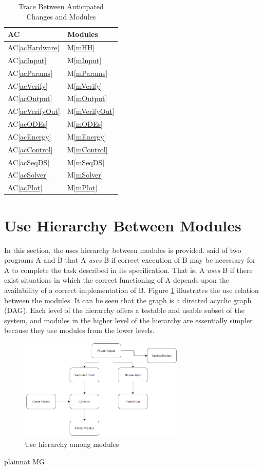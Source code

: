 \documentclass[12pt, titlepage]{article}
\newcommand{\acref}[1]{AC\ref{#1}}
\newcommand{\mref}[1]{M\ref{#1}}
\begin{document}
\begin{table}[H]
\centering
\begin{tabular}{p{} p{}}
\toprule
\textbf{AC} & \textbf{Modules}\\
\midrule
\acref{acHardware} & \mref{mHH}\\
\acref{acInput} & \mref{mInput}\\
\acref{acParams} & \mref{mParams}\\
\acref{acVerify} & \mref{mVerify}\\
\acref{acOutput} & \mref{mOutput}\\
\acref{acVerifyOut} & \mref{mVerifyOut}\\
\acref{acODEs} & \mref{mODEs}\\
\acref{acEnergy} & \mref{mEnergy}\\
\acref{acControl} & \mref{mControl}\\
\acref{acSeqDS} & \mref{mSeqDS}\\
\acref{acSolver} & \mref{mSolver}\\
\acref{acPlot} & \mref{mPlot}\\
\bottomrule
\end{tabular}
\caption{Trace Between Anticipated Changes and Modules}
\label{TblACT}
\end{table}

\section{Use Hierarchy Between Modules} \label{SecUse}

In this section, the uses hierarchy between modules is
provided. \citet{Parnas1978} said of two programs A and B that A {\em uses} B if
correct execution of B may be necessary for A to complete the task described in
its specification. That is, A {\em uses} B if there exist situations in which
the correct functioning of A depends upon the availability of a correct
implementation of B.  Figure \ref{FigUH} illustrates the use relation between
the modules. It can be seen that the graph is a directed acyclic graph
(DAG). Each level of the hierarchy offers a testable and usable subset of the
system, and modules in the higher level of the hierarchy are essentially simpler
because they use modules from the lower levels.

\begin{figure}[H]
\centering
\includegraphics[width=0.7\textwidth]{UsesHierarchy.png}
\caption{Use hierarchy among modules}
\label{FigUH}
\end{figure}


 {plainnat}
 {MG}
\end{document}
